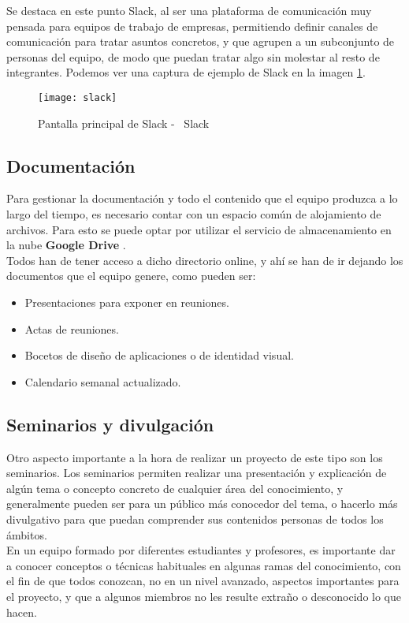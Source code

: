 Se destaca en este punto Slack, al ser una plataforma de comunicación muy pensada para equipos de trabajo de empresas, permitiendo definir canales de comunicación para tratar asuntos concretos, y que agrupen a un subconjunto de personas del equipo, de modo que puedan tratar algo sin molestar al resto de integrantes. Podemos ver una captura de ejemplo de Slack en la imagen \ref{slackimage}.

\begin{figure}
    \centering
    \texttt{[image: slack]}
    \caption{Pantalla principal de Slack - \textcopyright\ Slack}
    \label{slackimage}
\end{figure}

\subsection{Documentación}
Para gestionar la documentación y todo el contenido que el equipo produzca a lo largo del tiempo, es necesario contar con un espacio común de alojamiento de archivos. Para esto se puede optar por utilizar el servicio de almacenamiento en la nube \textbf{Google Drive} \cite{googledrive}.\\

Todos han de tener acceso a dicho directorio online, y ahí se han de ir dejando los documentos que el equipo genere, como pueden ser:
\begin{itemize}
    \item Presentaciones para exponer en reuniones.
    \item Actas de reuniones.
    \item Bocetos de diseño de aplicaciones o de identidad visual.
    \item Calendario semanal actualizado.
\end{itemize}

\subsection{Seminarios y divulgación}
Otro aspecto importante a la hora de realizar un proyecto de este tipo son los seminarios. Los seminarios permiten realizar una presentación y explicación de algún tema o concepto concreto de cualquier área del conocimiento, y generalmente pueden ser para un público más conocedor del tema, o hacerlo más divulgativo para que puedan comprender sus contenidos personas de todos los ámbitos.\\

En un equipo formado por diferentes estudiantes y profesores, es importante dar a conocer conceptos o técnicas habituales en algunas ramas del conocimiento, con el fin de que todos conozcan, no en un nivel avanzado, aspectos importantes para el proyecto, y que a algunos miembros no les resulte extraño o desconocido lo que hacen.\\

